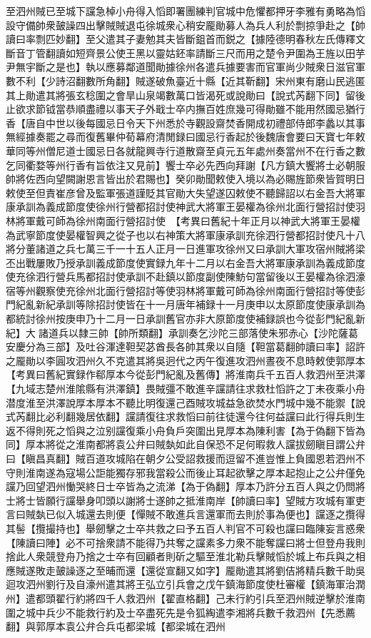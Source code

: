 至泗州賊已至城下讜急棹小舟得入慆即署團練判官城中危懼都押牙李雅有勇略為慆設守備帥衆皷譟四出擊賊賊退屯徐城衆心稍安龎勛募人為兵人利於剽掠爭赴之【帥讀曰率剽匹妙翻】至父遣其子妻勉其夫皆斷鉏首而鋭之【據陸德明春秋左氏傳釋文斷音丁管翻讀如短齊景公使王黑以靈姑鉟率請斷三尺而用之楚令尹圍為王旌以田芋尹無宇斷之是也】執以應募鄰道聞勛據徐州各遣兵據要害而官軍尚少賊衆日滋官軍數不利【少詩沼翻數所角翻】賊遂破魚臺近十縣【近其靳翻】宋州東有磨山民逃匿其上勛遣其將張玄稔圍之會旱山泉竭數萬口皆渴死或說勛曰【說式芮翻下同】留後止欲求節钺當恭順盡禮以事天子外戢士卒内撫百姓庶幾可得勛雖不能用然國忌猶行香【唐自中世以後每國忌日令天下州悉於寺觀設齋焚香開成初禮部侍郎李蠡以其事無經據奏罷之尋而復舊畢仲荀幕府清閒録曰國忌行香起於後魏唐會要曰天寶七年敕華同等州僧尼道士國忌日各就龍興寺行道散齋至貞元五年處州奏當州不在行香之數乞同衢婺等州行香有旨依注又見前】饗士卒必先西向拜謝【凡方鎮大饗將士必朝服帥將佐西向望闕謝恩言皆出於君賜也】癸卯勛聞敕使入境以為必賜旌節衆皆賀明日敕使至但責崔彦曾及監軍張道謹貶其官勛大失望遂囚敕使不聽歸詔以右金吾大將軍康承訓為義成節度使徐州行營都招討使神武大將軍王晏權為徐州北面行營招討使羽林將軍戴可師為徐州南面行營招討使　【考異曰舊紀十年正月以神武大將軍王晏權為武寧節度使晏權智興之從子也以右神策大將軍康承訓充徐泗行營都招討使凡十八將分董諸道之兵七萬三千一十五人正月一日進軍攻徐州又曰承訓大軍攻宿州賊將梁丕出戰屢敗乃授承訓義成節度使實録九年十二月以右金吾大將軍康承訓為義成節度使充徐泗行營兵馬都招討使承訓不赴鎮以節度副使陳魴句當留後以王晏權為徐泗濠宿等州觀察使充徐州北面行營招討等使羽林將軍戴可師為徐州南面行營招討等使彭門紀亂新紀承訓等除招討使皆在十一月唐年補録十一月庚申以太原節度使康承訓為都統討徐州按庚申乃十二月一日承訓舊官亦非大原節度使補録誤也今從彭門紀亂新紀】大諸道兵以隸三帥【帥所類翻】承訓奏乞沙陀三部落使朱邪赤心【沙陀薩葛安慶分為三部】及吐谷渾達靼契苾酋長各帥其衆以自隨【靼當葛翻帥讀曰率】詔許之龎勛以李圓攻泗州久不克遣其將吳迥代之丙午復進攻泗州晝夜不息時敕使郭厚本　【考異曰舊紀實録作郗厚本今從彭門紀亂及舊傳】將淮南兵千五百人救泗州至洪澤【九域志楚州淮隂縣有洪澤鎮】畏賊彊不敢進辛讜請往求救杜慆許之丁未夜乘小舟潜度淮至洪澤說厚本厚本不聽比明復還己酉賊攻城益急欲焚水門城中幾不能禦【說式芮翻比必利翻幾居依翻】讜請復往求救慆曰前往徒還今往何益讜曰此行得兵則生返不得則死之慆與之泣别讜復乘小舟負戶突圍出見厚本為陳利害【為于偽翻下皆為同】厚本將從之淮南都將袁公弁曰賊埶如此自保恐不足何暇救人讜拔劒瞋目謂公弁曰【瞋昌真翻】賊百道攻城陷在朝夕公受詔救援而逗留不進豈惟上負國恩若泗州不守則淮南遂為寇場公詎能獨存邪我當殺公而後止耳起欲擊之厚本起抱止之公弁僅免讜乃回望泗州慟哭終日士卒皆為之流涕【為于偽翻】厚本乃許分五百人與之仍問將士將士皆願行讜舉身叩頭以謝將士遂帥之抵淮南岸【帥讀曰率】望賊方攻城有軍吏言曰賊埶已似入城還去則便【憚賊不敢進兵言還軍而去則於事為便也】讜逐之攬得其髻【攬撮持也】舉劒擊之士卒共救之曰予五百人判官不可殺也讜曰臨陳妄言惑衆【陳讀曰陣】必不可捨衆請不能得乃共奪之讜素多力衆不能奪讜曰將士但登舟我則捨此人衆競登舟乃捨之士卒有回顧者則斫之驅至淮北勒兵擊賊慆於城上布兵與之相應賊遂敗走皷譟逐之至晡而還【還從宣翻又如字】龎勛遣其將劉佶將精兵數千助吳迴攻泗州劉行及自濠州遣其將王弘立引兵會之戊午鎮海節度使杜審權【鎮海軍治潤州】遣都頭翟行約將四千人救泗州【翟直格翻】己未行約引兵至泗州賊逆擊於淮南圍之城中兵少不能救行約及士卒盡死先是令狐綯遣李湘將兵數千救泗州【先悉薦翻】與郭厚本袁公弁合兵屯都梁城【都梁城在泗州